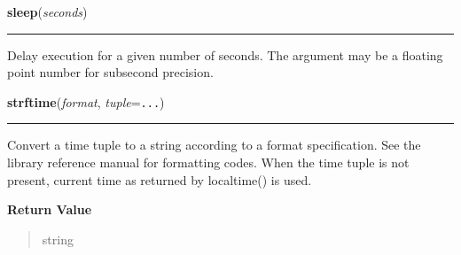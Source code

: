     \label{time:sleep}

    \vspace{0.5ex}

\hspace{.8\funcindent}\begin{boxedminipage}{\funcwidth}

    \raggedright \textbf{sleep}(\textit{seconds})

    \vspace{-1.5ex}

    \rule{\textwidth}{0.5\fboxrule}
\setlength{\parskip}{2ex}
    Delay execution for a given number of seconds.  The argument may be a 
    floating point number for subsecond precision.

\setlength{\parskip}{1ex}
    \end{boxedminipage}

    \label{time:strftime}

    \vspace{0.5ex}

\hspace{.8\funcindent}\begin{boxedminipage}{\funcwidth}

    \raggedright \textbf{strftime}(\textit{format}, \textit{tuple}={\tt ...})

    \vspace{-1.5ex}

    \rule{\textwidth}{0.5\fboxrule}
\setlength{\parskip}{2ex}
    Convert a time tuple to a string according to a format specification. 
    See the library reference manual for formatting codes. When the time 
    tuple is not present, current time as returned by localtime() is used.

\setlength{\parskip}{1ex}
      \textbf{Return Value}
    \vspace{-1ex}

      \begin{quote}
      string

      \end{quote}

    \end{boxedminipage}

    \label{time:strptime}

    \vspace{0.5ex}

